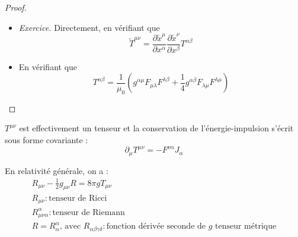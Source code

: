 \pagebreak

\begin{proof}\hspace*{1pt}
	\begin{itemize}
		\item \emph{Exercice.} Directement, en vérifiant que
		$$
			\tilde{T}^{\mu\nu}=\frac{\partial \tilde{x}^\mu}{\partial x^{\alpha}} \frac{\partial \tilde{x}^\nu}{\partial x^{\beta}} T^{\alpha\beta}
		$$
		\item En vérifiant que
		$$
			T^{\alpha\beta}=\frac{1}{\mu_0}\left(g^{\alpha\mu}F_{\mu\lambda}F^{\lambda\beta}+\frac{1}{4} g^{\alpha\beta}F_{\lambda\mu}F^{\lambda\mu}\right)
		$$
	\end{itemize}
\end{proof}

\begin{conc}
	$T^{\mu\nu}$ est effectivement un tenseur et la conservation de l'énergie-impulsion s'écrit sous forme covariante :
	$$
		\boxed{\partial_\mu T^{\mu\nu}=-F^{\nu\alpha}J_{\alpha}}
	$$
\end{conc}

\begin{remark}
	En relativité générale, on a :
	$$
		\begin{array}{l}
			R_{\mu\nu}-\frac{1}{2}g_{\mu\nu}R=8\pi gT_{\mu\nu}\\
			R_{\mu\nu} : \text{tenseur de Ricci}\\
			R^{\alpha}_{\mu\nu\alpha} : \text{tenseur de Riemann}\\
			R=R^{\alpha}_{\alpha}\text{, avec }R_{\alpha\beta\gamma\delta} :\text{fonction dérivée seconde de $g$ tenseur métrique}
		\end{array}
	$$

\end{remark}